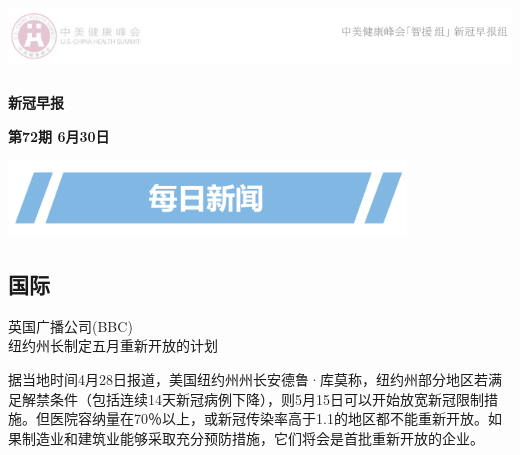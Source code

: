 \documentclass[
]{article}
\author{}
\date{\vspace{-2.5em}}
\begin{document}
\fontsize{22}{22}
\selectfont
\vspace{-10truemm}

\newcommand{\resheading}[1]{%
  \noindent\fcolorbox{lavenderblush}{lavenderblush}{\makebox[\dimexpr\textwidth-2\fboxsep-2\fboxrule][c]{\textbf{~#1}}}%
}

\begin{center}
\includegraphics[height=2cm]{./input/logo2.png} 
\end{center}

\begin{center}
\fontsize{45}{45}
\textcolor{glaucous}{\textbf{新冠早报}}
\end{center}

\begin{center}
\fontsize{22}{22}
{\textcolor{glaucous}{\textbf{第72期 \space 6月30日}}}
\end{center}

\begin{center}
\includegraphics[height=2cm]{./input/title1.png} 
\end{center}

\vspace{-5mm}

\hypertarget{section}{%
\subsection{\texorpdfstring{\textcolor{glaucous}{\Huge 国际}}{}}\label{section}}

\vspace{-3mm}

\begin{center}
\textcolor{glaucous}{英国广播公司(BBC)}\\纽约州长制定五月重新开放的计划

\end{center}

据当地时间4月28日报道，美国纽约州州长安德鲁·库莫称，纽约州部分地区若满足解禁条件（包括连续14天新冠病例下降），则5月15日可以开始放宽新冠限制措施。但医院容纳量在70％以上，或新冠传染率高于1.1的地区都不能重新开放。如果制造业和建筑业能够采取充分预防措施，它们将会是首批重新开放的企业。
\end{document}
